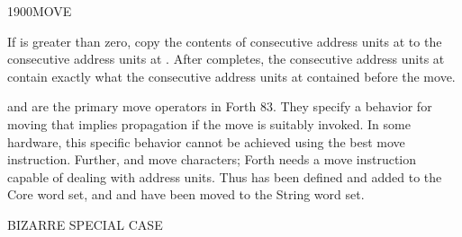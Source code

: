 \begin{worddef}{1900}{MOVE}
\item {}

	If  is greater than zero, copy the contents of 
	consecutive address units at  to the 
	consecutive address units at . After 
	completes, the  consecutive address units at 
	contain exactly what the  consecutive address units at
	 contained before the move.


	\begin{rationale} %
		 and  are the primary
		move operators in Forth 83. They specify a behavior for moving
		that implies propagation if the move is suitably invoked. In
		some hardware, this specific behavior cannot be achieved using
		the best move instruction. Further,  and
		 move characters; Forth needs a move
		instruction capable of dealing with address units. Thus
		 has been defined and added to the Core word set,
		and  and  have been
		moved to the String word set.
	\end{rationale}

	\begin{testing} %
		 \hfill {} BIZARRE SPECIAL CASE \\

		 \\

		 \\

		 \\

		 \\

		 \\
	\end{testing}
\end{worddef}

